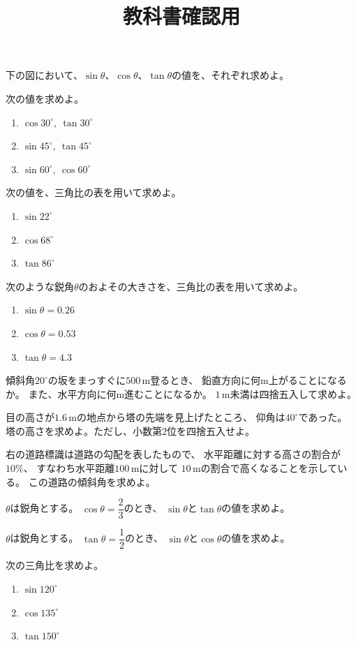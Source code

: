 \documentclass[a4paper, 10pt]{jarticle}
\begin{document}
\title{教科書確認用}
\maketitle

下の図において、$\sin\theta$、$\cos\theta$、$\tan\theta$の値を、それぞれ求めよ。

次の値を求めよ。
\begin{enumerate}
  \item $\cos30^\circ,\ \tan30^\circ$
  \item $\sin45^\circ,\ \tan45^\circ$
  \item $\sin60^\circ,\ \cos60^\circ$
\end{enumerate}

次の値を、三角比の表を用いて求めよ。
\begin{enumerate}
  \item $\sin22^\circ$
  \item $\cos68^\circ$
  \item $\tan86^\circ$
\end{enumerate}

次のような鋭角$\theta$のおよその大きさを、三角比の表を用いて求めよ。
\begin{enumerate}
  \item $\sin\theta=0.26$
  \item $\cos\theta=0.53$
  \item $\tan\theta=4.3$
\end{enumerate}

傾斜角$20^\circ$の坂をまっすぐに$500\,\mathrm{m}$登るとき、
鉛直方向に何$\mathrm{m}$上がることになるか。
また、水平方向に何$\mathrm{m}$進むことになるか。
$1\,\mathrm{m}$未満は四捨五入して求めよ。

目の高さが$1.6\,\mathrm{m}$の地点から塔の先端を見上げたところ、
仰角は$40^\circ$であった。
塔の高さを求めよ。ただし、小数第2位を四捨五入せよ。

右の道路標識は道路の勾配を表したもので、
水平距離に対する高さの割合が$10\%$、
すなわち水平距離$100\,\mathrm{m}$に対して
$10\,\mathrm{m}$の割合で高くなることを示している。
この道路の傾斜角を求めよ。

$\theta$は鋭角とする。
$\cos\theta=\dfrac{2}{3}$のとき、
$\sin\theta$と$\tan\theta$の値を求めよ。

$\theta$は鋭角とする。
$\tan\theta=\dfrac{1}{2}$のとき、
$\sin\theta$と$\cos\theta$の値を求めよ。

次の三角比を求めよ。
\begin{enumerate}
  \item $\sin120^\circ$
  \item $\cos135^\circ$
  \item $\tan150^\circ$
\end{enumerate}
\end{document}
